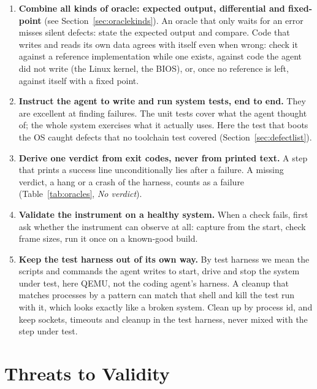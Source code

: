 \documentclass{article}
\begin{document}
\begin{enumerate}
  \item \textbf{Combine all kinds of oracle: expected output, differential and fixed-point} (see Section~\ref{sec:oraclekinds}). An
        oracle that only waits for an error misses silent defects: state the expected
        output and compare. Code that writes and reads its own data agrees with itself
        even when wrong: check it against a reference implementation while one exists,
        against code the agent did not write (the Linux kernel, the BIOS), or, once no
        reference is left, against itself with a fixed point.
  \item \textbf{Instruct the agent to write and run system tests, end to end.} They are
        excellent at finding failures. The unit tests cover what the agent thought of;
        the whole system exercises what it actually uses. Here the test that boots the
        OS caught defects that no toolchain test covered (Section~\ref{sec:defectlist}).
  \item \textbf{Derive one verdict from exit codes, never from printed text.} A step that
        prints a success line unconditionally lies after a failure. A missing verdict, a
        hang or a crash of the harness, counts as a failure
        (Table~\ref{tab:oracles}, \emph{No verdict}).
  \item \textbf{Validate the instrument on a healthy system.} When a check fails, first
        ask whether the instrument can observe at all: capture from the start, check frame
        sizes, run it once on a known-good build.
  \item \textbf{Keep the test harness out of its own way.} By test harness we mean the
        scripts and commands the agent writes to start, drive and stop the system under
        test, here QEMU, not the coding agent's harness. A
        cleanup that matches processes by a pattern can match that shell and kill the
        test run with it, which looks exactly like a broken system. Clean up by process
        id, and keep sockets, timeouts and cleanup in the test harness, never mixed
        with the step under test.
\end{enumerate}


\section{Threats to Validity}\label{sec:threats}
\end{document}
